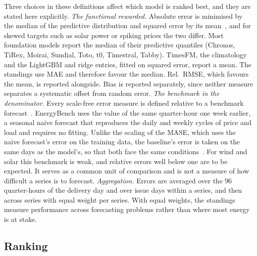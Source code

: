 \documentclass[11pt,a4paper]{article}
\begin{document}
Three choices in these definitions affect which model is ranked best, and they are stated here explicitly.
\emph{The functional rewarded.} Absolute error is minimised by the median of the
predictive distribution and squared error by its mean~\cite{gneiting2011}, and for skewed targets such as solar power
or spiking prices the two differ. Most foundation models report the median of their predictive quantiles (Chronos,
TiRex, Moirai, Sundial, Toto, t0, Timestral, Tabby). TimesFM, the climatology and the LightGBM and ridge entries,
fitted on squared error, report a mean. The standings use MAE and therefore favour the median. Rel.\ RMSE, which
favours the mean, is reported alongside. Bias is reported separately, since neither measure separates a systematic
offset from random error. \emph{The benchmark in the denominator.} Every scale-free error measure is defined relative to a
benchmark forecast~\cite{hyndmankoehler}. EnergyBench uses the value of the same quarter-hour one week earlier, a
seasonal naive forecast that reproduces the daily and weekly cycles of price and load and requires no fitting. Unlike the
scaling of the MASE, which uses the naive forecast's error on the training data, the baseline's error is taken on the
same days as the model's, so that both face the same conditions~\cite{davydenko}. For wind and solar this benchmark is weak, and relative errors well below one
are to be expected. It serves as a common unit of comparison and is not a measure of how difficult a series is to
forecast. \emph{Aggregation.} Errors are averaged over the 96 quarter-hours of the delivery day and over issue days
within a series, and then across series with equal weight per series. With equal weights, the standings measure
performance across forecasting problems rather than where most energy is at stake.

\subsection{Ranking}
\label{sec:ranking}
\end{document}
